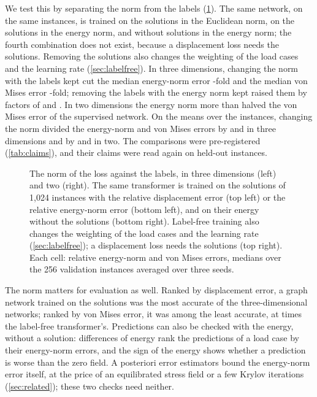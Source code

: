 We test this by separating the norm from the labels (\cref{fig:normlabels}). The same
network, on the same instances, is trained on the solutions in the Euclidean norm, on the
solutions in the energy norm, and without solutions in the energy norm; the fourth
combination does not exist, because a displacement loss needs the solutions. Removing the
solutions also changes the weighting of the load cases and the learning rate
(\cref{sec:labelfree}). In three dimensions, changing the norm with the labels kept cut the
median energy-norm error \numNlThreeNormE{}-fold and the median von Mises error
\numNlThreeNormVm{}-fold; removing the labels with the energy norm kept raised them by
factors of \numNlThreeLabelE{} and \numNlThreeLabelVm{}. In two dimensions the energy norm
more than halved the von Mises error of the supervised network. On the means over the instances,
changing the norm divided the energy-norm and von Mises errors by \numNlThreeNormEMean{} and
\numNlThreeNormVmMean{} in three dimensions and by \numNlCmNormEMean{} and
\numNlCmNormVmMean{} in two. The comparisons were pre-registered (\cref{tab:claims}), and
their claims were read again on held-out instances.

\begin{figure}[tbp]
\centering
{}
\caption{The norm of the loss against the labels, in three dimensions (left) and two (right).
The same transformer is trained on the solutions of 1,024 instances with the relative
displacement error (top left) or the relative energy-norm error (bottom left), and on their energy without the solutions (bottom right). Label-free training also changes the weighting of the load cases and the learning rate (\cref{sec:labelfree}); a displacement
loss needs the solutions (top right). Each cell: relative energy-norm and von Mises errors, medians over the 256
validation instances averaged over three seeds.}
\label{fig:normlabels}
\end{figure}

The norm matters for evaluation as well. Ranked by displacement error, a graph network
trained on the solutions was the most accurate of the three-dimensional networks; ranked by
von Mises error, it was among the least accurate, at \numThreeMgnOverFreeVm{} times the
label-free transformer's. Predictions can also be checked with the energy, without a solution:
differences of energy rank the predictions of a load case by their energy-norm errors, and
the sign of the energy shows whether a prediction is worse than the zero field. A posteriori
error estimators bound the energy-norm error itself, at the price of an equilibrated stress
field or a few Krylov iterations (\cref{sec:related}); these two checks need neither.

